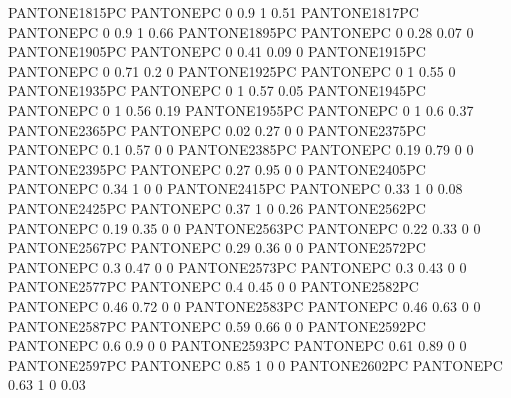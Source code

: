 {PANTONE1815PC} {PANTONE\SpotSpace PC} {0 0.9 1 0.51}
 {PANTONE1817PC} {PANTONE\SpotSpace PC} {0 0.9 1 0.66}
 {PANTONE1895PC} {PANTONE\SpotSpace PC} {0 0.28 0.07 0}
 {PANTONE1905PC} {PANTONE\SpotSpace PC} {0 0.41 0.09 0}
 {PANTONE1915PC} {PANTONE\SpotSpace PC} {0 0.71 0.2 0}
 {PANTONE1925PC} {PANTONE\SpotSpace PC} {0 1 0.55 0}
 {PANTONE1935PC} {PANTONE\SpotSpace PC} {0 1 0.57 0.05}
 {PANTONE1945PC} {PANTONE\SpotSpace PC} {0 1 0.56 0.19}
 {PANTONE1955PC} {PANTONE\SpotSpace PC} {0 1 0.6 0.37}
 {PANTONE2365PC} {PANTONE\SpotSpace PC} {0.02 0.27 0 0}
 {PANTONE2375PC} {PANTONE\SpotSpace PC} {0.1 0.57 0 0}
 {PANTONE2385PC} {PANTONE\SpotSpace PC} {0.19 0.79 0 0}
 {PANTONE2395PC} {PANTONE\SpotSpace PC} {0.27 0.95 0 0}
 {PANTONE2405PC} {PANTONE\SpotSpace PC} {0.34 1 0 0}
 {PANTONE2415PC} {PANTONE\SpotSpace PC} {0.33 1 0 0.08}
 {PANTONE2425PC} {PANTONE\SpotSpace PC} {0.37 1 0 0.26}
 {PANTONE2562PC} {PANTONE\SpotSpace PC} {0.19 0.35 0 0}
 {PANTONE2563PC} {PANTONE\SpotSpace PC} {0.22 0.33 0 0}
 {PANTONE2567PC} {PANTONE\SpotSpace PC} {0.29 0.36 0 0}
 {PANTONE2572PC} {PANTONE\SpotSpace PC} {0.3 0.47 0 0}
 {PANTONE2573PC} {PANTONE\SpotSpace PC} {0.3 0.43 0 0}
 {PANTONE2577PC} {PANTONE\SpotSpace PC} {0.4 0.45 0 0}
 {PANTONE2582PC} {PANTONE\SpotSpace PC} {0.46 0.72 0 0}
 {PANTONE2583PC} {PANTONE\SpotSpace PC} {0.46 0.63 0 0}
 {PANTONE2587PC} {PANTONE\SpotSpace PC} {0.59 0.66 0 0}
 {PANTONE2592PC} {PANTONE\SpotSpace PC} {0.6 0.9 0 0}
 {PANTONE2593PC} {PANTONE\SpotSpace PC} {0.61 0.89 0 0}
 {PANTONE2597PC} {PANTONE\SpotSpace PC} {0.85 1 0 0}
 {PANTONE2602PC} {PANTONE\SpotSpace PC} {0.63 1 0 0.03}
